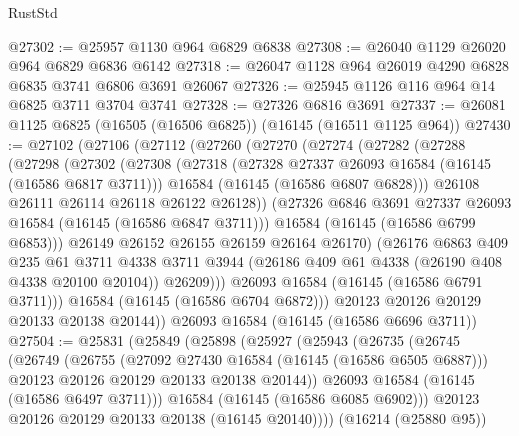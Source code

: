 \begin{lexlean}{RustStd}
\begin{coremodule}
@27302 := @25957 @1130 @964 @6829 @6838
@27308 := @26040 @1129 @26020 @964 @6829 @6836 @6142
@27318 := @26047 @1128 @964 @26019 @4290 @6828 @6835 @3741 @6806 @3691 @26067
@27326 := @25945 @1126 @116 @964 @14 @6825 @3711 @3704 @3741
@27328 := @27326 @6816 @3691
@27337 := @26081 @1125 @6825 (@16505 (@16506 @6825)) (@16145 (@16511 @1125 @964))
@27430 := @27102
    (@27106
      (@27112
        (@27260
          (@27270
            (@27274
              (@27282
                (@27288
                  (@27298
                    (@27302
                      (@27308
                        (@27318
                          (@27328 @27337 @26093 @16584 (@16145 (@16586 @6817 @3711)))
                          @16584
                          (@16145 (@16586 @6807 @6828)))
                        @26108
                        @26111
                        @26114
                        @26118
                        @26122
                        @26128))
                    (@27326 @6846 @3691 @27337 @26093 @16584 (@16145 (@16586 @6847 @3711)))
                    @16584
                    (@16145 (@16586 @6799 @6853)))
                  @26149
                  @26152
                  @26155
                  @26159
                  @26164
                  @26170)
                (@26176
                  @6863
                  @409
                  @235
                  @61
                  @3711
                  @4338
                  @3711
                  @3944
                  (@26186 @409 @61 @4338 (@26190 @408 @4338 @20100 @20104))
                  @26209)))
            @26093
            @16584
            (@16145 (@16586 @6791 @3711)))
          @16584
          (@16145 (@16586 @6704 @6872)))
        @20123
        @20126
        @20129
        @20133
        @20138
        @20144))
    @26093
    @16584
    (@16145 (@16586 @6696 @3711))
@27504 := @25831
    (@25849
      (@25898
        (@25927
          (@25943
            (@26735
              (@26745
                (@26749
                  (@26755
                    (@27092 @27430 @16584 (@16145 (@16586 @6505 @6887)))
                    @20123
                    @20126
                    @20129
                    @20133
                    @20138
                    @20144))
                @26093
                @16584
                (@16145 (@16586 @6497 @3711)))
              @16584
              (@16145 (@16586 @6085 @6902)))
            @20123
            @20126
            @20129
            @20133
            @20138
            (@16145 @20140))))
      (@16214 (@25880 @95))

\end{coremodule}
\end{lexlean}
